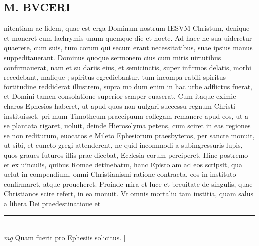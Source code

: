 \documentclass{article}
\begin{document}
\begin{pages}
\section*{M. BVCERI }\pstart nitentiam ac fidem, quae est erga Dominum nostrum IESVM Christum, denique  et moneret cum lachrymis unum quemque  die et nocte. Ad haec ne sua uideretur quaerere, cum suis, tum corum qui secum erant necessitatibus, suae ipsius manus suppeditauerant. Dominus quoque  sermonem cius cum miris uirtutibus confirmauerat, nam et su dariis eius, et semicinctis, super infirmos delatis, morbi recedebant, malique ; spiritus egrediebantur, tum incompa rabili spiritus fortitudine reddiderat illustrem, supra mo dum enim in hac urbe adflictus fuerat, et Domini tamen consolatione superior semper euaserat.   \pend\pstart Cum itaque  eximie charos Ephesios haberet, ut apud quos non uulgari successu regnum Christi instituisset, pri mum Timotheum praecipuum collegam remancre apud eos, ut a se plantata rigaret, uoluit, deinde Hierosolyma petens, cum sciret in eas regiones se non rediturum, euocatos e Mileto Ephesiorum praesbyteros, per sancte monuit, ut sibi, et cuncto gregi attenderent, ne quid incommodi a subingressuris lupis, quos graues futuros illis prae dicebat, Ecclesia eorum perciperet.  Hinc postremo et ex uinculis, quibus Romae detinebatur, hanc Epistolam ad eos scripsit, qua uelut in compendium, omni Christianismi ratione contracta, eos in instituto confirmaret, atque  proueheret.   \pend\pstart Proinde mira et luce et breuitate de singulis, quae Christianos scire refert, in ea monuit.  Vt omnis mortaliu tam iustitia, quam salus a libera Dei praedestinatioue et  \pend
\vspace{0.5cm}\noindent
\vspace{0.2cm}\rule{1cm}{0.2pt}\\ 
\hspace{0.2cm}\textit{mg}
\footnotesize Quam fuerit pro Ephesiis solicitus.  
\normalsize| 

\end{pages}
\end{document}
